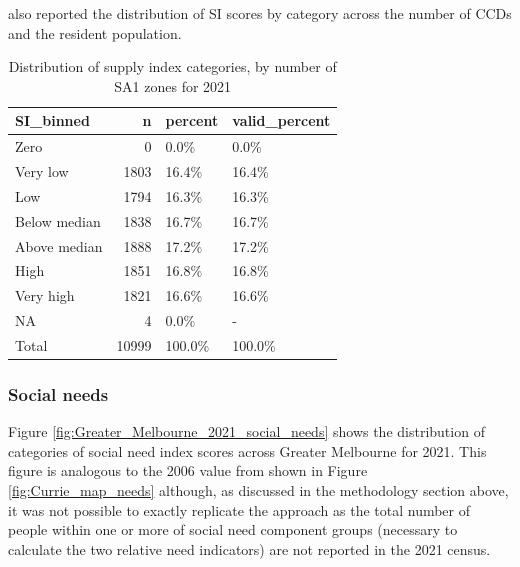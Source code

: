\documentclass[preprint, 3p,
authoryear]{elsarticle} %
\begin{document}
\citet{currie2010identifying} also reported the distribution of SI
scores by category across the number of CCDs and the resident
population.

\begin{table}

\caption{\label{tab:Greater_Melbourne_2016_2021_sa1_population}Distribution of supply index categories, by number of SA1 zones for 2021}
\centering
\begin{tabular}[t]{l|r|l|l}
\hline
SI\_binned & n & percent & valid\_percent\\
\hline
Zero & 0 & 0.0\% & 0.0\%\\
\hline
Very low & 1803 & 16.4\% & 16.4\%\\
\hline
Low & 1794 & 16.3\% & 16.3\%\\
\hline
Below median & 1838 & 16.7\% & 16.7\%\\
\hline
Above median & 1888 & 17.2\% & 17.2\%\\
\hline
High & 1851 & 16.8\% & 16.8\%\\
\hline
Very high & 1821 & 16.6\% & 16.6\%\\
\hline
NA & 4 & 0.0\% & -\\
\hline
Total & 10999 & 100.0\% & 100.0\%\\
\hline
\end{tabular}
\end{table}

\subsubsection{Social needs}\label{social-needs}

Figure \ref{fig:Greater_Melbourne_2021_social_needs} shows the
distribution of categories of social need index scores across Greater
Melbourne for 2021. This figure is analogous to the 2006 value from
\citet{currie2010identifying} shown in Figure \ref{fig:Currie_map_needs}
although, as discussed in the methodology section above, it was not
possible to exactly replicate the \citet{currie2010identifying} approach
as the total number of people within one or more of social need
component groups (necessary to calculate the two relative need
indicators) are not reported in the 2021 census.
\end{document}
